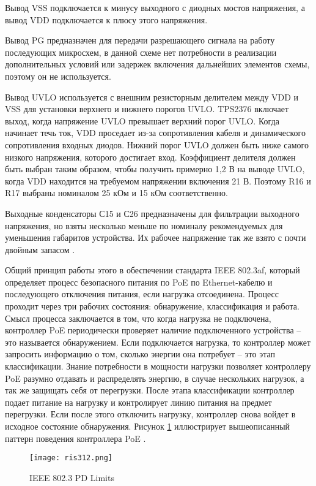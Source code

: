 Вывод VSS подключается к минусу выходного с диодных мостов напряжения, 
а вывод VDD подключается к плюсу этого напряжения.

Вывод PG предназначен для передачи разрешающего сигнала на работу последующих микросхем,
в данной схеме нет потребности в реализации дополнительных условий или задержек включения
дальнейших элементов схемы, поэтому он не используется.

Вывод UVLO используется с внешним резисторным делителем между VDD и VSS для установки 
верхнего и нижнего порогов UVLO. TPS2376 включает выход, когда напряжение UVLO превышает верхний 
порог UVLO. Когда начинает течь ток, VDD проседает из-за сопротивления кабеля и динамического 
сопротивления входных диодов. Нижний порог UVLO должен быть ниже самого низкого напряжения, 
которого достигает вход. Коэффициент делителя должен быть выбран таким образом, 
чтобы получить примерно 1,2 В на выводе UVLO, когда VDD находится на требуемом 
напряжении включения 21 В. Поэтому R16 и R17 выбраны номиналом 25 кОм и 15 кОм соответственно.

Выходные конденсаторы С15 и С26 предназначены для фильтрации выходного напряжения, но взяты 
несколько меньше по номиналу рекомендуемых для уменьшения габаритов устройства. Их рабочее
напряжение так же взято с почти двойным запасом \cite{TPS2376:datasheet}.

Общий принцип работы этого в обеспечении стандарта IEEE 802.3af, который определяет 
процесс безопасного питания по PoE по Ethernet-кабелю и последующего отключения питания, 
если нагрузка отсоединена. Процесс проходит через три рабочих состояния: обнаружение, 
классификация и работа. Смысл процесса заключается в том, что когда нагрузка не подключена,
контроллер PoE периодически проверяет наличие подключенного устройства -- это называется 
обнаружением. Если подключается нагрузка, то контроллер может запросить информацию о том,
сколько энергии она потребует -- это этап классификации. Знание потребности в мощности нагрузки 
позволяет контроллеру PoE разумно отдавать и распределять энергию, в случае нескольких нагрузок,
а так же защищать себя от перегрузки. После этапа классификации контроллер подает питание на 
нагрузку и контролирует линию питания на предмет перегрузки. Если после этого отключить нагрузку,
контроллер снова войдет в исходное состояние обнаружения. Рисунок \ref{ris:312}  иллюстрирует 
вышеописанный паттерн поведения контроллера PoE \cite{TPS2376:datasheet}.

\begin{figure}[H]
    \centering
    \texttt{[image: ris312.png]}
    \caption{IEEE 802.3 PD Limits}
    \label{ris:312}
\end{figure}

